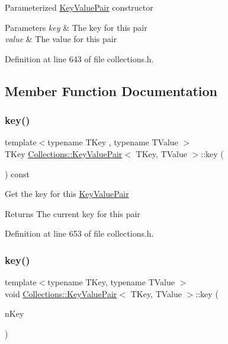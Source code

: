 Parameterized \hyperlink{class_collections_1_1_key_value_pair}{Key\+Value\+Pair} constructor 
\begin{DoxyParams}{Parameters}
{\em key} & The key for this pair \\
\hline
{\em value} & The value for this pair \\
\hline
\end{DoxyParams}


Definition at line 643 of file collections.\+h.



\subsection{Member Function Documentation}
\hypertarget{class_collections_1_1_key_value_pair_a677589bdfb5b66154ff76beac4289958}{}\label{class_collections_1_1_key_value_pair_a677589bdfb5b66154ff76beac4289958} 
\subsubsection{\texorpdfstring{key()}{key()}\hspace{0.1cm}{\footnotesize\ttfamily [1/2]}}
{\footnotesize\ttfamily template$<$typename T\+Key , typename T\+Value $>$ \\
T\+Key \hyperlink{class_collections_1_1_key_value_pair}{Collections\+::\+Key\+Value\+Pair}$<$ T\+Key, T\+Value $>$\+::key (\begin{DoxyParamCaption}{ }\end{DoxyParamCaption}) const}

Get the key for this \hyperlink{class_collections_1_1_key_value_pair}{Key\+Value\+Pair} \begin{DoxyReturn}{Returns}
The current key for this pair 
\end{DoxyReturn}


Definition at line 653 of file collections.\+h.

\hypertarget{class_collections_1_1_key_value_pair_aa0c15557fd02131df792d633b3e094c9}{}\label{class_collections_1_1_key_value_pair_aa0c15557fd02131df792d633b3e094c9} 
\subsubsection{\texorpdfstring{key()}{key()}\hspace{0.1cm}{\footnotesize\ttfamily [2/2]}}
{\footnotesize\ttfamily template$<$typename T\+Key, typename T\+Value $>$ \\
void \hyperlink{class_collections_1_1_key_value_pair}{Collections\+::\+Key\+Value\+Pair}$<$ T\+Key, T\+Value $>$\+::key (\begin{DoxyParamCaption}\item[{T\+Key}]{n\+Key }\end{DoxyParamCaption})}

